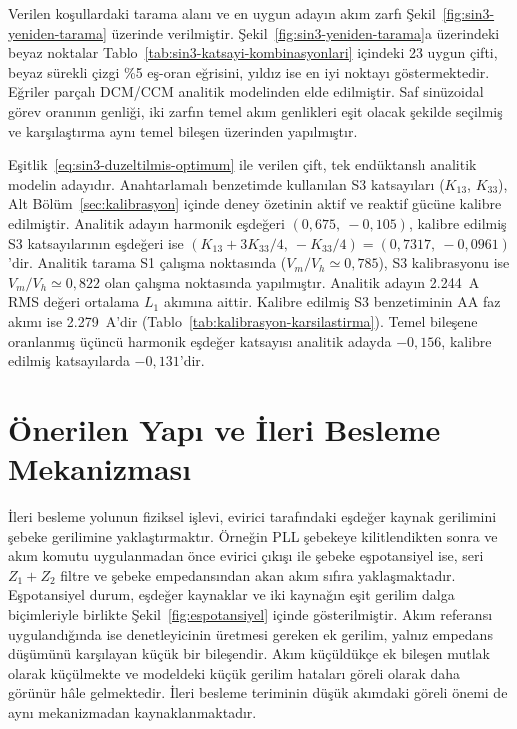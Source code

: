 Verilen koşullardaki tarama alanı ve en uygun adayın akım zarfı Şekil~\ref{fig:sin3-yeniden-tarama} üzerinde verilmiştir. Şekil~\ref{fig:sin3-yeniden-tarama}a üzerindeki beyaz noktalar Tablo~\ref{tab:sin3-katsayi-kombinasyonlari} içindeki \num{23} uygun çifti, beyaz sürekli çizgi \%5 eş-oran eğrisini, yıldız ise en iyi noktayı göstermektedir. Eğriler parçalı DCM/CCM analitik modelinden elde edilmiştir. Saf sinüzoidal görev oranının genliği, iki zarfın temel akım genlikleri eşit olacak şekilde seçilmiş ve karşılaştırma aynı temel bileşen üzerinden yapılmıştır.

Eşitlik~\eqref{eq:sin3-duzeltilmis-optimum} ile verilen çift, tek endüktanslı analitik modelin adayıdır. Anahtarlamalı benzetimde kullanılan S3 katsayıları ($K_{13}$, $K_{33}$), Alt Bölüm~\ref{sec:kalibrasyon} içinde deney özetinin aktif ve reaktif gücüne kalibre edilmiştir. Analitik adayın harmonik eşdeğeri $(0{,}675,\ -0{,}105)$, kalibre edilmiş S3 katsayılarının eşdeğeri ise $(K_{13}+3K_{33}/4,\ -K_{33}/4)=(0{,}7317,\ -0{,}0961)$'dir. Analitik tarama S1 çalışma noktasında ($V_m/V_h\simeq0{,}785$), S3 kalibrasyonu ise $V_m/V_h\simeq0{,}822$ olan çalışma noktasında yapılmıştır. Analitik adayın \SI{2.244}{\ampere} RMS değeri ortalama $L_1$ akımına aittir. Kalibre edilmiş S3 benzetiminin AA faz akımı ise \SI{2.279}{\ampere}'dir (Tablo~\ref{tab:kalibrasyon-karsilastirma}). Temel bileşene oranlanmış üçüncü harmonik eşdeğer katsayısı analitik adayda $-0{,}156$, kalibre edilmiş katsayılarda $-0{,}131$'dir.

\section{Önerilen Yapı ve İleri Besleme Mekanizması}

İleri besleme yolunun fiziksel işlevi, evirici tarafındaki eşdeğer kaynak gerilimini şebeke gerilimine yaklaştırmaktır. Örneğin PLL şebekeye kilitlendikten sonra ve akım komutu uygulanmadan önce evirici çıkışı ile şebeke eşpotansiyel ise, seri $Z_1+Z_2$ filtre ve şebeke empedansından akan akım sıfıra yaklaşmaktadır. Eşpotansiyel durum, eşdeğer kaynaklar ve iki kaynağın eşit gerilim dalga biçimleriyle birlikte Şekil~\ref{fig:espotansiyel} içinde gösterilmiştir. Akım referansı uygulandığında ise denetleyicinin üretmesi gereken ek gerilim, yalnız empedans düşümünü karşılayan küçük bir bileşendir. Akım küçüldükçe ek bileşen mutlak olarak küçülmekte ve modeldeki küçük gerilim hataları göreli olarak daha görünür hâle gelmektedir. İleri besleme teriminin düşük akımdaki göreli önemi de aynı mekanizmadan kaynaklanmaktadır.

